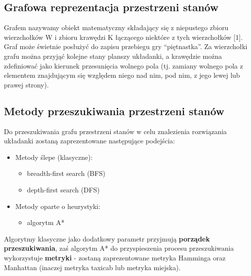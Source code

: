 \documentclass[11pt]{article}
\providecommand{\tightlist}{%
      \setlength{\itemsep}{0pt}\setlength{\parskip}{0pt}}
\begin{document}
\hypertarget{grafowa-reprezentacja-przestrzeni-stanuxf3w}{%
\subsection{Grafowa reprezentacja przestrzeni
stanów}\label{grafowa-reprezentacja-przestrzeni-stanuxf3w}}

Grafem nazywamy obiekt matematyczny składający się z niepustego zbioru
wierzchołków W i zbioru krawędzi K łączącego niektóre z tych
wierzchołków {[}1{]}. Graf może świetnie posłużyć do zapisu przebiegu
gry ``piętnastka''. Za wierzchołki grafu można przyjąć kolejne stany
planszy układanki, a krawędzie można zdefiniować jako kierunek
przesunięcia wolnego pola (tj. zamiany wolnego pola z elementem
znajdującym się względem niego nad nim, pod nim, z jego lewej lub prawej
strony).

\hypertarget{metody-przeszukiwania-przestrzeni-stanuxf3w}{%
\subsection{Metody przeszukiwania przestrzeni
stanów}\label{metody-przeszukiwania-przestrzeni-stanuxf3w}}

Do przeszukiwania grafu przestrzeni stanów w celu znalezienia
rozwiązania układanki zostaną zaprezentowane następujące podejścia:

\begin{itemize}
\tightlist
\item
  Metody ślepe (klasyczne):

  \begin{itemize}
  \tightlist
  \item
    breadth-first search (BFS)
  \item
    depth-first search (DFS)
  \end{itemize}
\item
  Metody oparte o heurystyki:

  \begin{itemize}
  \tightlist
  \item
    algorytm A*
  \end{itemize}
\end{itemize}

Algorytmy klasyczne jako dodatkowy parametr przyjmują \textbf{porządek
przeszukiwania}, zaś algorytm A* do przyspieszenia procesu
przeszukiwania wykorzystuje \textbf{metryki} - zostaną zaprezentowane
metryka Hamminga oraz Manhattan (inaczej metryka taxicab lub metryka
miejska).
\end{document}
